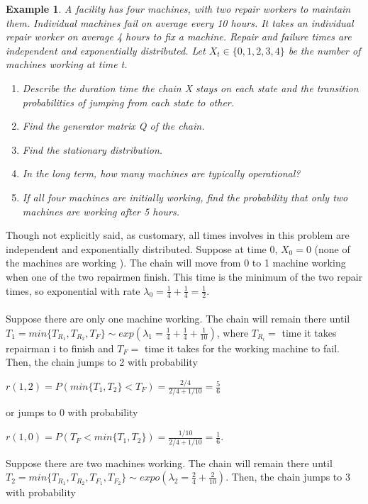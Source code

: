 \documentclass[12pt]{article}
\newtheorem{example}{Example}
\begin{document}
\begin{example}
    A facility has four machines, with two repair workers to maintain them. Individual machines fail on average every 10 hours. It takes an individual repair worker on average 4 hours to fix a machine. Repair and failure times are independent and exponentially distributed. Let $X_t \in \{0, 1, 2, 3, 4\}$ be the number of machines working at time t.
    \begin{enumerate}
        \item Describe the duration time the chain X stays on each state and the transition probabilities of jumping from each state to other.
        \item Find the generator matrix Q of the chain.
        \item Find the stationary distribution.
        \item In the long term, how many machines are typically operational?
        \item If all four machines are initially working, find the probability that only two machines are working after 5 hours.
    \end{enumerate}
\end{example}

\noindent Though not explicitly said, as customary, all times involves in this problem are independent and exponentially distributed. Suppose at time 0, $X_0 = 0$ (none of the machines are working ). The chain will move from 0 to 1 machine working when one of the two repairmen finish. This time is the minimum of the two repair times, so exponential with rate $\lambda_0 = \frac{1}{4} + \frac{1}{4} = \frac{1}{2}$.
\\
\\Suppose there are only one machine working. The chain will remain there until
$T_1 = min\{T_{R_1}, T_{R_2}, T_F\} \sim exp(\lambda_1 = \frac{1}{4} + \frac{1}{4} + \frac{1}{10})$, where $T_{R_i} = $ time it takes repairman i to finish and $T_F = $ time it takes for the working machine to fail. Then, the chain jumps to 2 with probability
\begin{center}
    $r(1,2) = P(min\{T_1, T_2\} < T_F) = \frac{2/4}{2/4 + 1/10} = \frac{5}{6}$
\end{center}
or jumps to 0 with probability
\begin{center}
    $r(1,0) = P(T_F < min\{T_1, T_2\}) = \frac{1/10}{2/4 + 1/10} = \frac{1}{6}$.
\end{center}

\noindent Suppose there are two machines working. The chain will remain there until $T_2 = min\{T_{R_1}, T_{R_2}, T_{F_1}, T_{F_2} \} \sim expo(\lambda_2 = \frac{2}{4} + \frac{2}{10})$. Then, the chain jumps to 3 with probability
\end{document}
